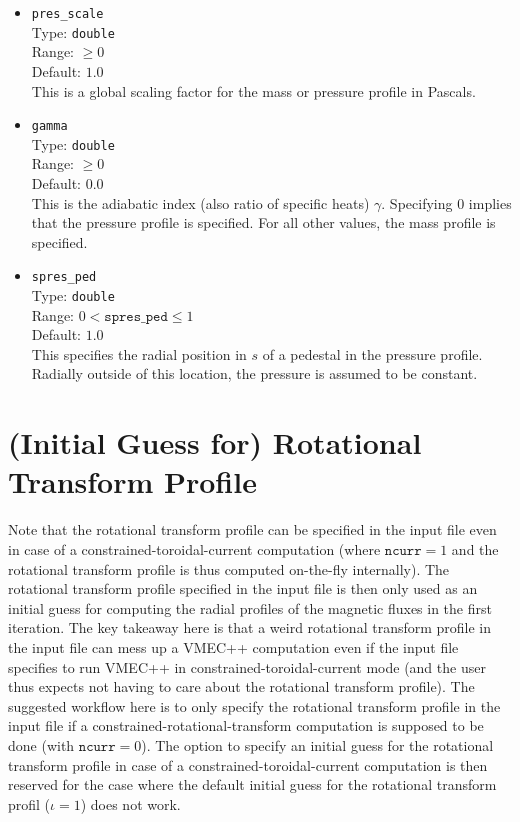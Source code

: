\begin{itemize}
 \item \texttt{pres\_scale} \\
       Type: \texttt{double} \\
       Range: $\geq 0$ \\
       Default: $1.0$ \\
       This is a global scaling factor for the mass or pressure profile in Pascals.

 \item \texttt{gamma} \\
       Type: \texttt{double} \\
       Range: $\geq 0$ \\
       Default: $0.0$ \\
       This is the adiabatic index (also ratio of specific heats) $\gamma$.
       Specifying $0$ implies that the pressure profile is specified.
       For all other values, the mass profile is specified.

 \item \texttt{spres\_ped} \\
       Type: \texttt{double} \\
       Range: $0 < \texttt{spres\_ped} \leq 1$ \\
       Default: $1.0$ \\
       This specifies the radial position in $s$ of a pedestal in the pressure profile.
       Radially outside of this location, the pressure is assumed to be constant.

\end{itemize}

\section{(Initial Guess for) Rotational Transform Profile}

Note that the rotational transform profile can be specified in the input file
even in case of a constrained-toroidal-current computation
(where $\texttt{ncurr} = 1$ and the rotational transform profile is thus computed on-the-fly internally).
The rotational transform profile specified in the input file
is then only used as an initial guess for computing the radial profiles of the magnetic fluxes
in the first iteration.
The key takeaway here is that a weird rotational transform profile in the input file
can mess up a VMEC++ computation even if the input file specifies
to run VMEC++ in constrained-toroidal-current mode
(and the user thus expects not having to care about the rotational transform profile).
The suggested workflow here is to only specify the rotational transform profile in the input file
if a constrained-rotational-transform computation is supposed to be done (with $\texttt{ncurr} = 0$).
The option to specify an initial guess for the rotational transform profile
in case of a constrained-toroidal-current computation is then reserved for the case
where the default initial guess for the rotational transform profil ($\iota = 1$) does not work.


